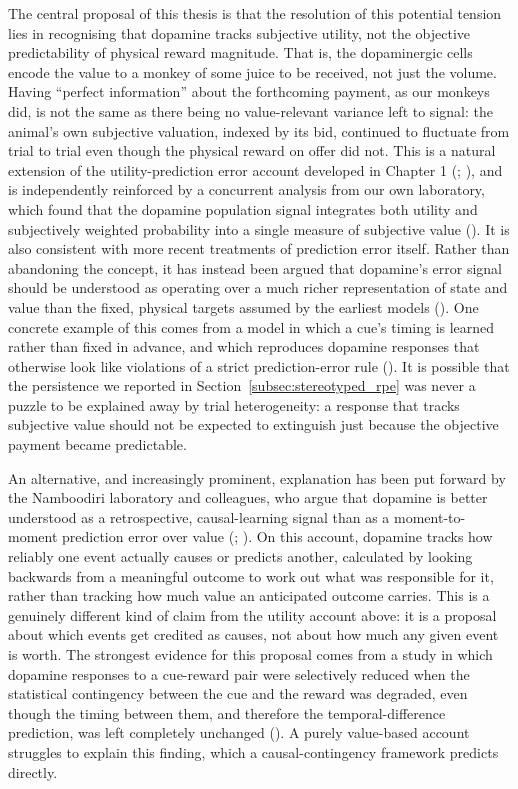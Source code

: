The central proposal of this thesis is that the resolution of this potential tension lies in recognising that dopamine tracks subjective utility, not the objective predictability of physical reward magnitude. That is, the dopaminergic cells encode the value to a monkey of some juice to be received, not just the volume. Having ``perfect information'' about the forthcoming payment, as our monkeys did, is not the same as there being no value-relevant variance left to signal: the animal's own subjective valuation, indexed by its bid, continued to fluctuate from trial to trial even though the physical reward on offer did not. This is a natural extension of the utility-prediction error account developed in Chapter 1 (\cite{staufferDopamineRewardPrediction2014}; \cite{lakDopaminePredictionError2014}), and is independently reinforced by a concurrent analysis from our own laboratory, which found that the dopamine population signal integrates both utility and subjectively weighted probability into a single measure of subjective value (\cite{ferrari-tonioloCodingBasicComponents2025}). It is also consistent with more recent treatments of prediction error itself. Rather than abandoning the concept, it has instead been argued that dopamine's error signal should be understood as operating over a much richer representation of state and value than the fixed, physical targets assumed by the earliest models (\cite{gershmanExplainingDopaminePrediction2024}). One concrete example of this comes from a model in which a cue's timing is learned rather than fixed in advance, and which reproduces dopamine responses that otherwise look like violations of a strict prediction-error rule (\cite{coneLearningExpressReward2024}). It is possible that the persistence we reported in Section~\ref{subsec:stereotyped_rpe} was never a puzzle to be explained away by trial heterogeneity: a response that tracks subjective value should not be expected to extinguish just because the objective payment became predictable.

An alternative, and increasingly prominent, explanation has been put forward by the Namboodiri laboratory and colleagues, who argue that dopamine is better understood as a retrospective, causal-learning signal than as a moment-to-moment prediction error over value (\cite{jeongMesolimbicDopamineRelease2022}; \cite{namboodiriWhyDopamineCausal2024}). On this account, dopamine tracks how reliably one event actually causes or predicts another, calculated by looking backwards from a meaningful outcome to work out what was responsible for it, rather than tracking how much value an anticipated outcome carries. This is a genuinely different kind of claim from the utility account above: it is a proposal about which events get credited as causes, not about how much any given event is worth. The strongest evidence for this proposal comes from a study in which dopamine responses to a cue-reward pair were selectively reduced when the statistical contingency between the cue and the reward was degraded, even though the timing between them, and therefore the temporal-difference prediction, was left completely unchanged (\cite{garrMesostriatalDopamineSensitive2024}). A purely value-based account struggles to explain this finding, which a causal-contingency framework predicts directly.

